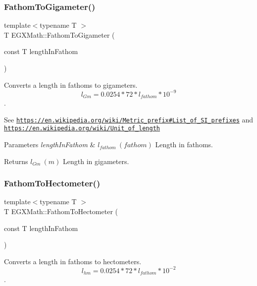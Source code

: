 \subsubsection{\texorpdfstring{Fathom\+To\+Gigameter()}{FathomToGigameter()}}
{\footnotesize\ttfamily template$<$typename T $>$ \\
T E\+G\+X\+Math\+::\+Fathom\+To\+Gigameter (\begin{DoxyParamCaption}\item[{const T}]{length\+In\+Fathom }\end{DoxyParamCaption})}



Converts a length in fathoms to gigameters. \[ l_{Gm}=0.0254 * 72 * l_{fathom} * 10^{-9} \]. 

See \href{https://en.wikipedia.org/wiki/Metric_prefix#List_of_SI_prefixes}{\tt https\+://en.\+wikipedia.\+org/wiki/\+Metric\+\_\+prefix\#\+List\+\_\+of\+\_\+\+S\+I\+\_\+prefixes} and \href{https://en.wikipedia.org/wiki/Unit_of_length}{\tt https\+://en.\+wikipedia.\+org/wiki/\+Unit\+\_\+of\+\_\+length} 
\begin{DoxyParams}{Parameters}
{\em length\+In\+Fathom} & $ l_{fathom}\ (fathom)$ Length in fathoms. \\
\hline
\end{DoxyParams}
\begin{DoxyReturn}{Returns}
$ l_{Gm}\ (m)$ Length in gigameters. 
\end{DoxyReturn}
\mbox{\label{group___e_g_x_math-_conversions-_length_conversions-_nautical-_fathom-_s_i_ga2667f0d80cdd5d547a9a5bc0f1220768}} 
\subsubsection{\texorpdfstring{Fathom\+To\+Hectometer()}{FathomToHectometer()}}
{\footnotesize\ttfamily template$<$typename T $>$ \\
T E\+G\+X\+Math\+::\+Fathom\+To\+Hectometer (\begin{DoxyParamCaption}\item[{const T}]{length\+In\+Fathom }\end{DoxyParamCaption})}



Converts a length in fathoms to hectometers. \[ l_{hm}=0.0254 * 72 * l_{fathom} * 10^{-2} \]. 

